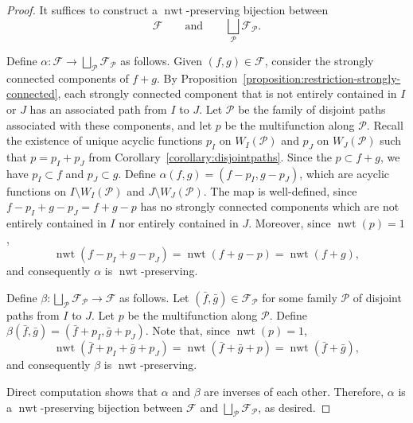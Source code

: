 \documentclass[11pt]{article}
\theoremstyle{definition}
\numberwithin{equation}{section}
\DeclareMathOperator{\normalizedweight}{nwt}
\begin{document}
\begin{proof}
    It suffices to construct a \(\normalizedweight\)-preserving bijection between
    \begin{equation*}
        \mathcal{F} 
        \qquad \text{and} \qquad 
        \bigsqcup_{\mathcal{P}} \mathcal{F}_{\mathcal{P}}.
    \end{equation*}

    Define \(\alpha \colon \mathcal{F} \to \bigsqcup_{\mathcal{P}} \mathcal{F}_{\mathcal{P}}\) as follows.
    Given \((f, g) \in \mathcal{F}\),
    consider the strongly connected components of \(f+g\).
    By Proposition~\ref{proposition:restriction-strongly-connected},
    each strongly connected component that is not entirely contained in \(I\) or \(J\) has an associated path from \(I\) to \(J\).
    Let \(\mathcal{P}\) be the family of disjoint paths associated with these components,
    and let \(p\) be the multifunction along \(\mathcal{P}\).
    Recall the existence of unique acyclic functions \(p_I\) on \(W_I(\mathcal{P})\) and \(p_J\) on \(W_J(\mathcal{P})\) such that \(p = p_I + p_J\) from Corollary~\ref{corollary:disjointpaths}.
    Since the \(p \subset f+g\), we have \(p_I \subset f\) and \(p_J \subset g\).
    Define \(\alpha(f, g) = (f - p_I, g - p_J)\), which are acyclic functions on \(I \setminus W_I(\mathcal{P})\) and \(J \setminus W_J(\mathcal{P})\).
    The map is well-defined, since \(f - p_I + g - p_J = f + g - p\) has no strongly connected components which are not entirely contained in \(I\) nor entirely contained in \(J\).
    Moreover, since \(\normalizedweight(p) = 1\),
    \begin{equation*}
        \normalizedweight(f - p_I + g - p_J) = \normalizedweight(f + g - p) = \normalizedweight(f + g),
    \end{equation*}
    and consequently \(\alpha\) is \(\normalizedweight\)-preserving.

    Define \(\beta \colon \bigsqcup_{\mathcal{P}} \mathcal{F}_{\mathcal{P}} \to \mathcal{F}\) as follows.
    Let \((\bar{f}, \bar{g}) \in \mathcal{F}_{\mathcal{P}}\) for some family \(\mathcal{P}\) of disjoint paths from \(I\) to \(J\).
    Let \(p\) be the multifunction along \(\mathcal{P}\).
    Define \(\beta(\bar{f}, \bar{g}) = (\bar{f} + p_I, \bar{g} + p_J)\).
    Note that, since \(\normalizedweight(p) = 1\),
    \begin{equation*}
        \normalizedweight(\bar{f} + p_I + \bar{g} + p_J) = \normalizedweight(\bar{f} + \bar{g} + p) = \normalizedweight(\bar{f} + \bar{g}),
    \end{equation*}
    and consequently \(\beta\) is \(\normalizedweight\)-preserving.

    Direct computation shows that \(\alpha\) and \(\beta\) are inverses of each other.
    Therefore, \(\alpha\) is a \(\normalizedweight\)-preserving bijection between \(\mathcal{F}\) and \(\bigsqcup_{\mathcal{P}} \mathcal{F}_{\mathcal{P}}\), as desired.
\end{proof}
\end{document}
